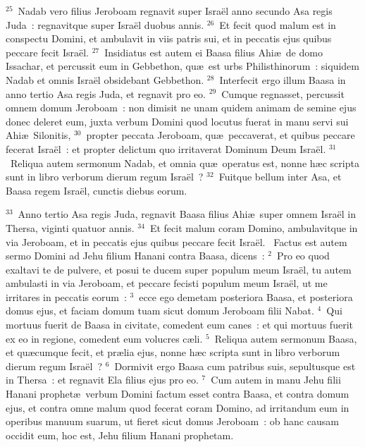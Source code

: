 ${}^{25}$~Nadab vero filius Jeroboam regnavit super Isra\"el anno secundo Asa regis Juda~: regnavitque super Isra\"el duobus annis.
${}^{26}$~Et fecit quod malum est in conspectu Domini, et ambulavit in viis patris sui, et in peccatis ejus quibus peccare fecit Isra\"el.
${}^{27}$~Insidiatus est autem ei Baasa filius Ahi\ae\ de domo Issachar, et percussit eum in Gebbethon, qu\ae\ est urbs Philisthinorum~: siquidem Nadab et omnis Isra\"el obsidebant Gebbethon.
${}^{28}$~Interfecit ergo illum Baasa in anno tertio Asa regis Juda, et regnavit pro eo.
${}^{29}$~Cumque regnasset, percussit omnem domum Jeroboam~: non dimisit ne unam quidem animam de semine ejus donec deleret eum, juxta verbum Domini quod locutus fuerat in manu servi sui Ahi\ae\ Silonitis,
${}^{30}$~propter peccata Jeroboam, qu\ae\ peccaverat, et quibus peccare fecerat Isra\"el~: et propter delictum quo irritaverat Dominum Deum Isra\"el.
${}^{31}$~Reliqua autem sermonum Nadab, et omnia qu\ae\ operatus est, nonne h\ae c scripta sunt in libro verborum dierum regum Isra\"el~?
${}^{32}$~Fuitque bellum inter Asa, et Baasa regem Isra\"el, cunctis diebus eorum.


${}^{33}$~Anno tertio Asa regis Juda, regnavit Baasa filius Ahi\ae\ super omnem Isra\"el in Thersa, viginti quatuor annis.
${}^{34}$~Et fecit malum coram Domino, ambulavitque in via Jeroboam, et in peccatis ejus quibus peccare fecit Isra\"el.
~\lettrine[lines=10,image=true,loversize=0.05,lraise=-0.03]{F}{}actus est autem sermo Domini ad Jehu filium Hanani contra Baasa, dicens~:
${}^{2}$~Pro eo quod exaltavi te de pulvere, et posui te ducem super populum meum Isra\"el, tu autem ambulasti in via Jeroboam, et peccare fecisti populum meum Isra\"el, ut me irritares in peccatis eorum~:
${}^{3}$~ecce ego demetam posteriora Baasa, et posteriora domus ejus, et faciam domum tuam sicut domum Jeroboam filii Nabat.
${}^{4}$~Qui mortuus fuerit de Baasa in civitate, comedent eum canes~: et qui mortuus fuerit ex eo in regione, comedent eum volucres c\ae li.
${}^{5}$~Reliqua autem sermonum Baasa, et qu\ae cumque fecit, et pr\ae lia ejus, nonne h\ae c scripta sunt in libro verborum dierum regum Isra\"el~?
${}^{6}$~Dormivit ergo Baasa cum patribus suis, sepultusque est in Thersa~: et regnavit Ela filius ejus pro eo.
${}^{7}$~Cum autem in manu Jehu filii Hanani prophet\ae\ verbum Domini factum esset contra Baasa, et contra domum ejus, et contra omne malum quod fecerat coram Domino, ad irritandum eum in operibus manuum suarum, ut fieret sicut domus Jeroboam~: ob hanc causam occidit eum, hoc est, Jehu filium Hanani prophetam.


